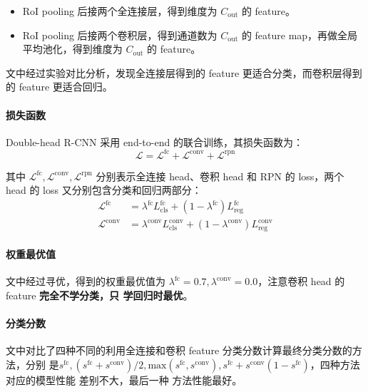 \begin{itemize}
  \item RoI pooling 后接两个全连接层，得到维度为 $C_{\mathrm{out}}$ 的 feature。
  \item RoI pooling 后接两个卷积层，得到通道数为 $C_{\mathrm{out}}$ 的 feature
    map，再做全局平均池化，得到维度为 $C_{\mathrm{out}}$ 的 feature。
\end{itemize}

文中经过实验对比分析，发现全连接层得到的 feature 更适合分类，而卷积层得到
的 feature 更适合回归。

\paragraph{损失函数}
Double-head R-CNN 采用 end-to-end 的联合训练，其损失函数为：
\begin{equation}
  \label{equ:double-head-loss}
  \mathcal{L} = \mathcal{L}^{\mathrm{fc}} + \mathcal{L}^{\mathrm{conv}} + \mathcal{L}^{\mathrm{rpn}}
\end{equation}

其中 $\mathcal{L}^{\mathrm{fc}}, \mathcal{L}^{\mathrm{conv}},
\mathcal{L}^{\mathrm{rpn}}$ 分别表示全连接 head、卷积 head 和 RPN 的 loss，两个
head 的 loss 又分别包含分类和回归两部分：
\begin{align}
  \label{equ:double-head-fc-loss}
  \mathcal{L}^{\mathrm{fc}} & = \lambda^{\mathrm{fc}}L_{\mathrm{cls}}^{\mathrm{fc}} + (1-\lambda^{\mathrm{fc}})L_{\mathrm{reg}}^{\mathrm{fc}} \\
  \label{equ:double-head-conv-loss}
  \mathcal{L}^{\mathrm{conv}} & = \lambda^{\mathrm{conv}}L_{\mathrm{cls}}^{\mathrm{conv}} + (1-\lambda^{\mathrm{conv}})L_{\mathrm{reg}}^{\mathrm{conv}}
\end{align}

\paragraph{权重最优值}
文中经过寻优，得到的权重最优值为 $\lambda^{\mathrm{fc}} = 0.7,
\lambda^{\mathrm{\mathrm{conv}}} = 0.0$，注意卷积 head 的 feature \textbf{完全不学分类，只
学回归时最优}。

\paragraph{分类分数}
文中对比了四种不同的利用全连接和卷积 feature 分类分数计算最终分类分数的方法，分别
是$s^{\mathrm{fc}}, (s^{\mathrm{fc}} + s^{\mathrm{conv}})/2,
\mathrm{max}(s^{\mathrm{fc}}, s^{\mathrm{conv}}), s^{\mathrm{fc}} +
s^{\mathrm{conv}}(1-s^{\mathrm{fc}})$，四种方法对应的模型性能 差别不大，最后一种
方法性能最好。

